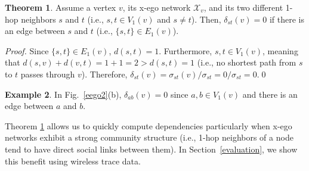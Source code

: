 \documentclass[journal]{IEEEtran}
\newcommand{\D}[3]{\delta_{{#1}{#2}}({#3})}
\newcommand{\V}[2]{V_{#2}({#1})}
\newcommand{\E}[2]{E_{#2}({#1})}
\newcommand{\XN}[1]{\mathcal{X}_{{#1}}}
\newcommand{\BX}[1]{B^{\mathcal{X}}({#1})}
\theoremstyle{definition}
\newtheorem{theorem}{Theorem}[section]
\newtheorem{example}[theorem]{Example}
\begin{document}
\begin{theorem}
\label{theorem1} 
Assume a vertex $v$, its x-ego network $\XN{v}$, and its two different 1-hop neighbors $s$ and $t$ (i.e., $s, t \in \V{v}{1}$ and $s \ne t$).
Then, $\D{s}{t}{v} = 0$ if there is an edge between $s$ and $t$ (i.e., $\{s, t\} \in \E{v}{1}$).
\begin{proof}
Since $\{s, t\} \in \E{v}{1}$, $d(s, t) = 1$.
Furthermore, $s, t \in \V{v}{1}$, meaning that $d(s, v) + d(v, t) = 1 + 1 = 2 > d(s, t) = 1$ (i.e., no shortest path from $s$ to $t$ passes through $v$).
Therefore, $\D{s}{t}{v} = \sigma_{st}(v)/\sigma_{st} = 0/\sigma_{st} = 0$.\hfill\qed
\end{proof}
\end{theorem}


\begin{example}
In Fig.~\ref{eego2}(b), $\D{a}{b}{v} = 0$ since $a, b \in \V{v}{1}$ and there is an edge between $a$ and $b$.
\end{example}

% 

Theorem \ref{theorem1} allows us to quickly compute dependencies particularly when x-ego networks exhibit a strong community structure (i.e., 1-hop neighbors of a node tend to have direct social links between them).
In Section~\ref{evaluation}, we show this benefit using wireless trace data.
\end{document}
